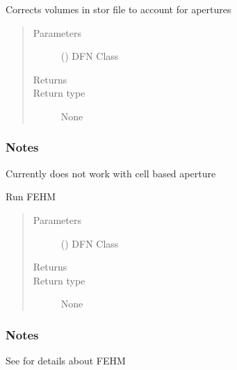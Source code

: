 \documentclass[letterpaper,10pt,english]{sphinxmanual}
\begin{document}
\begin{fulllineitems}
\label{\detokenize{pydfnworks:pydfnworks.dfnFlow.fehm.correct_stor_file}}
Corrects volumes in stor file to account for apertures
\begin{quote}\begin{description}
\item[{Parameters}] \leavevmode
{} () \textendash{} DFN Class

\item[{Returns}] \leavevmode


\item[{Return type}] \leavevmode
None

\end{description}\end{quote}
\subsubsection*{Notes}

Currently does not work with cell based aperture

\end{fulllineitems}


\begin{fulllineitems}
\label{\detokenize{pydfnworks:pydfnworks.dfnFlow.fehm.fehm}}
Run FEHM
\begin{quote}\begin{description}
\item[{Parameters}] \leavevmode
{} () \textendash{} DFN Class

\item[{Returns}] \leavevmode


\item[{Return type}] \leavevmode
None

\end{description}\end{quote}
\subsubsection*{Notes}

See  for details about FEHM

\end{fulllineitems}
\end{document}
